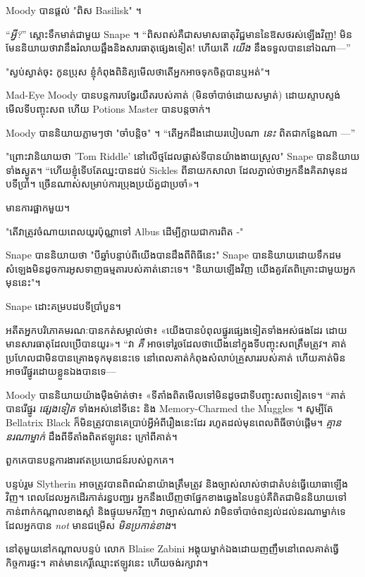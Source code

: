 {{{{{{Moody បានផ្តល់ "ពិស Basilisk" ។

“\emph{អ្វី?}” ស្ដោះទឹកមាត់ជាមួយ Snape ។ “ពិសពស់គឺជាសមាសធាតុវិជ្ជមាននៃឱសថរស់ឡើងវិញ! មិន​មែន​និយាយ​ថា​វា​នឹង​រំលាយ​ឆ្អឹង​និង​សារធាតុ​ផ្សេង​ទៀត​! ហើយតើ \emph{យើង} នឹងទទួលបាននៅឯណា—”

"ស្ងប់ស្ងាត់ចុះ កូនប្រុស ខ្ញុំកំពុងពិនិត្យមើលថាតើអ្នកអាចទុកចិត្តបានឬអត់"។

Mad-Eye Moody បានបន្តការបង្វែរយឺតរបស់គាត់ (មិនចាំបាច់ដោយសម្ងាត់) ដោយស្ទាបស្ទង់មើលទីបញ្ចុះសព ហើយ Potions Master បានបន្តចាក់។

Moody បាននិយាយភ្លាមៗថា "ចាំបន្តិច" ។ “តើអ្នកដឹងដោយរបៀបណា \emph{នេះ} ពិតជាកន្លែងណា —”

"ព្រោះវានិយាយថា 'Tom Riddle' នៅលើថ្មដែលផ្លាស់ទីបានយ៉ាងងាយស្រួល" Snape បាននិយាយទាំងស្ងួត។ “ហើយខ្ញុំទើបតែឈ្នះបានដប់ Sickles ពីនាយកសាលា ដែលភ្នាល់ថាអ្នកនឹងគិតវាមុនដបទីប្រាំ។ ច្រើន​ណាស់​សម្រាប់​ការ​ប្រុង​ប្រយ័ត្ន​ជា​ប្រចាំ»។

មានការផ្អាកមួយ។

"តើវាត្រូវចំណាយពេលយូរប៉ុណ្ណាទៅ Albus ដើម្បីក្លាយជាការពិត -"

Snape បាននិយាយថា "បីឆ្នាំបន្ទាប់ពីយើងបានដឹងពីពិធីនេះ" Snape បាននិយាយដោយទឹកដមសំឡេងមិនដូចការអូសទាញធម្មតារបស់គាត់នោះទេ។ "និយាយឡើងវិញ យើងគួរតែពិគ្រោះជាមួយអ្នកមុននេះ"។

Snape ដោះគម្របដបទីប្រាំបួន។

អតីត​អ្នក​បរិភោគ​មរណៈ​បាន​កត់​សម្គាល់​ថា៖ «យើង​បាន​បំពុល​ផ្នូរ​ផ្សេង​ទៀត​ទាំង​អស់​ផង​ដែរ ដោយ​មាន​សារធាតុ​ដែល​ប្រើ​បាន​យូរ»។ “វា \emph{គឺ} អាចទៅរួចដែលថាយើងនៅក្នុងទីបញ្ចុះសពត្រឹមត្រូវ។ គាត់ប្រហែលជាមិនបានគ្រោងទុកមុននេះទេ នៅពេលគាត់កំពុងសំលាប់គ្រួសាររបស់គាត់ ហើយគាត់មិនអាចរើផ្នូរដោយខ្លួនឯងបានទេ—

Moody បាន​និយាយ​យ៉ាង​ម៉ឺងម៉ាត់​ថា​៖ «​ទីតាំង​ពិត​មើលទៅ​មិន​ដូចជា​ទី​បញ្ចុះសព​ទៀត​ទេ​។ “គាត់បានរើផ្នូរ \emph{ផ្សេងទៀត} ទាំងអស់នៅទីនេះ និង Memory-Charmed the Muggles ។ សូម្បីតែ Bellatrix Black ក៏មិនត្រូវបានគេប្រាប់អ្វីអំពីរឿងនេះដែរ រហូតដល់មុនពេលពិធីចាប់ផ្តើម។ \emph{គ្មាននរណាម្នាក់} ដឹងពីទីតាំងពិតឥឡូវនេះ ក្រៅពីគាត់។

ពួកគេបានបន្តការងារឥតប្រយោជន៍របស់ពួកគេ។


បន្ទប់រួម Slytherin អាចត្រូវបានពិពណ៌នាយ៉ាងត្រឹមត្រូវ និងច្បាស់លាស់ថាជាតំបន់ធ្វើយោធាឡើងវិញ។ ពេលដែលអ្នកដើរកាត់រន្ធបញ្ឈរ អ្នកនឹងឃើញថាផ្នែកខាងឆ្វេងនៃបន្ទប់គឺពិតជាមិននិយាយទៅកាន់ពាក់កណ្តាលខាងស្តាំ និងផ្ទុយមកវិញ។ វាច្បាស់ណាស់ វាមិនចាំបាច់ពន្យល់ដល់នរណាម្នាក់ទេ ដែលអ្នកបាន \emph{not} មានជម្រើស \emph{មិនប្រកាន់ខាង}។

នៅតុមួយនៅកណ្តាលបន្ទប់ លោក Blaise Zabini អង្គុយម្នាក់ឯងដោយញញឹមនៅពេលគាត់ធ្វើកិច្ចការផ្ទះ។ គាត់​មាន​កេរ្តិ៍ឈ្មោះ​ឥឡូវ​នេះ ហើយ​ចង់​រក្សា​វា​។

}}}}}}
